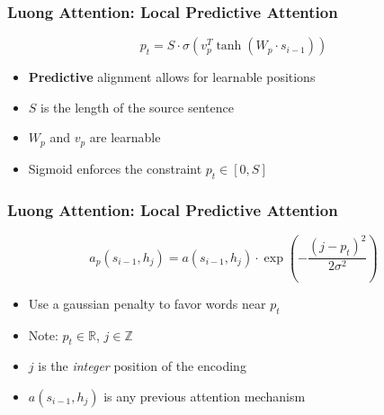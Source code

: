 \documentclass[usenames,dvipsnames]{beamer}
\begin{document}
\begin{frame}
  \frametitle{Luong Attention: Local Predictive Attention}
  \begin{equation*}
    p_t = S \cdot \sigma \left( v_p^T \tanh \left( W_p \cdot s_{i-1} \right) \right)
  \end{equation*}
  \begin{itemize}
    \item \textbf{Predictive} alignment allows for learnable positions
    \item $S$ is the length of the source sentence
    \item $W_p$ and $v_p$ are learnable
    \item Sigmoid enforces the constraint $p_t \in \left[ 0, S \right]$
  \end{itemize}
\end{frame}

\begin{frame}
  \frametitle{Luong Attention: Local Predictive Attention}
  \begin{equation*}
    a_{p} \left( s_{i-1}, h_j \right) = a\left( s_{i-1}, h_j \right) \cdot \exp \left( -\frac{ \left(j - p_t\right)^{2} }{2\sigma^2} \right)
  \end{equation*}
  \begin{itemize}
    \item Use a gaussian penalty to favor words near $p_t$
    \item Note: $p_t \in \mathbb{R}$, $j \in \mathbb{Z}$
    \item $j$ is the \textit{integer} position of the encoding
    \item $a\left( s_{i-1}, h_j \right)$ is any previous attention mechanism
  \end{itemize}
\end{frame}
\end{document}
